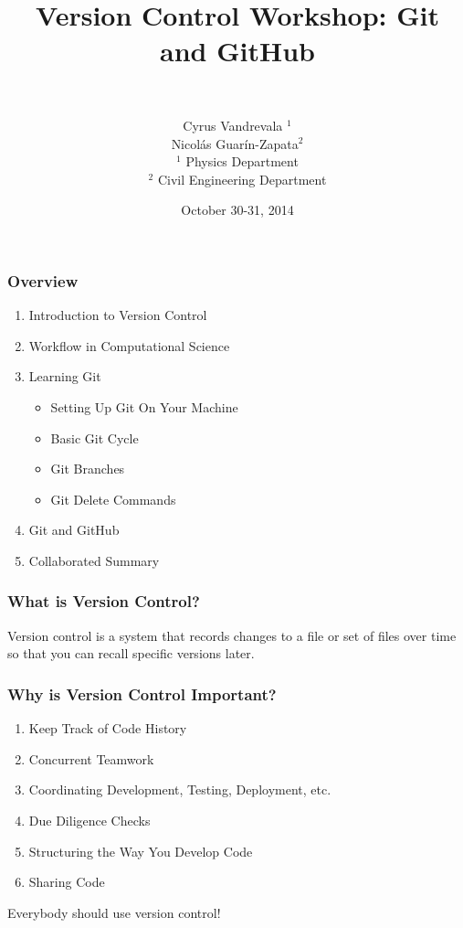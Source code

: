 


\title{Version Control Workshop: Git and GitHub}
\subtitle{~}
\author[AUTHOR]{\scriptsize{Cyrus Vandrevala $^1$\\Nicol\'as Guar\'in-Zapata$^2$}\\
\tiny{$^1$ Physics Department\\ $^2$ Civil Engineering Department}}
\date{October 30-31, 2014}




\begin{frame}[plain]
  \titlepage
\end{frame}

\begin{frame}
\frametitle{\large{Overview}}
\begin{enumerate}
\item Introduction to Version Control
\item Workflow in Computational Science
\item Learning Git
\begin{itemize}
\item Setting Up Git On Your Machine
\item Basic Git Cycle
\item Git Branches
\item Git Delete Commands
\end{itemize}
\item Git and GitHub
\item Collaborated Summary
\end{enumerate}
\end{frame}


\begin{frame}
\frametitle{\large{What is Version Control?}}
Version control is a system that records changes to a file or set of files over time so that you can recall specific versions later.
\end{frame}

\begin{frame}
\frametitle{\large{Why is Version Control Important?}}
\begin{enumerate}
\item Keep Track of Code History
\pause
\item Concurrent Teamwork
\pause
\item Coordinating Development, Testing, Deployment, etc.
\pause
\item Due Diligence Checks
\pause
\item Structuring the Way You Develop Code
\pause
\item Sharing Code
\end{enumerate}
\pause
Everybody should use version control!
\end{frame}

